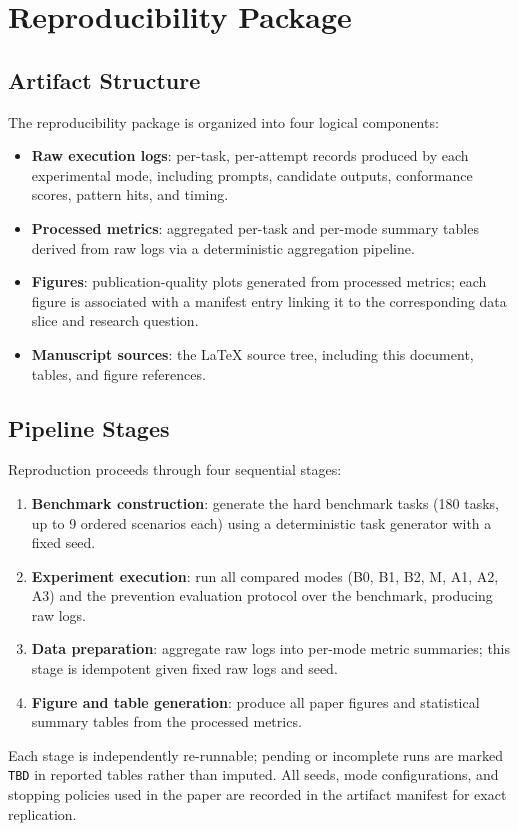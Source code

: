 \section{Reproducibility Package}
\label{app:repro}

\subsection{Artifact Structure}
The reproducibility package is organized into four logical components:
\begin{itemize}
  \item \textbf{Raw execution logs}: per-task, per-attempt records produced by each experimental mode, including prompts, candidate outputs, conformance scores, pattern hits, and timing.
  \item \textbf{Processed metrics}: aggregated per-task and per-mode summary tables derived from raw logs via a deterministic aggregation pipeline.
  \item \textbf{Figures}: publication-quality plots generated from processed metrics; each figure is associated with a manifest entry linking it to the corresponding data slice and research question.
  \item \textbf{Manuscript sources}: the \LaTeX{} source tree, including this document, tables, and figure references.
\end{itemize}

\subsection{Pipeline Stages}
Reproduction proceeds through four sequential stages:
\begin{enumerate}
  \item \textbf{Benchmark construction}: generate the hard benchmark tasks (180 tasks, up to 9 ordered scenarios each) using a deterministic task generator with a fixed seed.
  \item \textbf{Experiment execution}: run all compared modes (B0, B1, B2, M, A1, A2, A3) and the prevention evaluation protocol over the benchmark, producing raw logs.
  \item \textbf{Data preparation}: aggregate raw logs into per-mode metric summaries; this stage is idempotent given fixed raw logs and seed.
  \item \textbf{Figure and table generation}: produce all paper figures and statistical summary tables from the processed metrics.
\end{enumerate}
Each stage is independently re-runnable; pending or incomplete runs are marked \texttt{TBD} in reported tables rather than imputed.
All seeds, mode configurations, and stopping policies used in the paper are recorded in the artifact manifest for exact replication.
